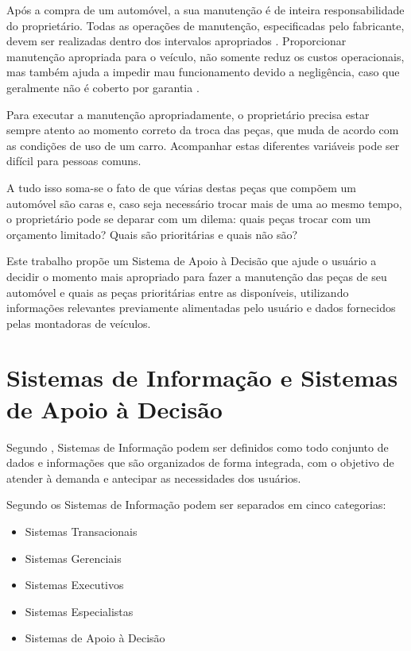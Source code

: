 \documentclass[12pt]{article}
\begin{document}
Após a compra de um automóvel, a sua manutenção é de inteira responsabilidade
do proprietário. Todas as operações de manutenção, especificadas pelo fabricante,
devem ser realizadas dentro dos intervalos apropriados \cite{manualhyundai}.
Proporcionar manutenção apropriada para o veículo, não somente reduz os custos
operacionais, mas também ajuda a impedir mau funcionamento devido a negligência,
caso que geralmente não é coberto por garantia \cite{manualonix}.

Para executar a manutenção apropriadamente, o proprietário precisa estar
sempre atento ao momento correto da troca das peças, que muda de acordo
com as condições de uso de um carro. Acompanhar estas diferentes variáveis pode
ser difícil para pessoas comuns.

A tudo isso soma-se o fato de que várias destas peças que compõem um automóvel
são caras e, caso seja necessário trocar mais de uma ao mesmo tempo, o
proprietário pode se deparar com um dilema: quais peças trocar com um orçamento
limitado? Quais são prioritárias e quais não são?

Este trabalho propõe um Sistema de Apoio à Decisão que ajude o usuário a
decidir o momento mais apropriado para fazer a manutenção das peças de seu
automóvel e quais as peças prioritárias entre as disponíveis, utilizando
informações relevantes previamente alimentadas pelo usuário e dados fornecidos
pelas montadoras de veículos.

\section{Sistemas de Informação e Sistemas de Apoio à Decisão} \label{sec:sisad}
Segundo , Sistemas de Informação podem ser
definidos como todo conjunto de dados e informações que são organizados de forma
integrada, com o objetivo de atender à demanda e antecipar as necessidades dos
usuários.

Segundo  os Sistemas de Informação podem ser
separados em cinco categorias:

\begin{itemize}
    \item Sistemas Transacionais
    \item Sistemas Gerenciais
    \item Sistemas Executivos
    \item Sistemas Especialistas
    \item Sistemas de Apoio à Decisão
\end{itemize}
\end{document}
